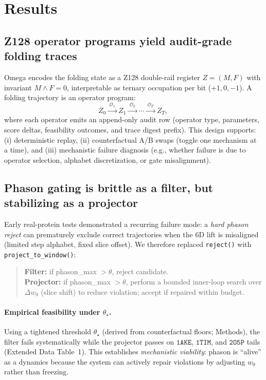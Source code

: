 \documentclass[10pt]{article}
\begin{document}
\section{Results}

\subsection{Z128 operator programs yield audit-grade folding traces}
Omega encodes the folding state as a Z128 double-rail register \(Z=(M,F)\) with invariant \(M \wedge F = 0\), interpretable as ternary occupation per bit (\(+1,0,-1\)).
A folding trajectory is an operator program:
\[
Z_0 \xrightarrow{\;\mathcal{O}_1\;} Z_1 \xrightarrow{\;\mathcal{O}_2\;} \cdots \xrightarrow{\;\mathcal{O}_T\;} Z_T,
\]
where each operator emits an append-only audit row (operator type, parameters, score deltas, feasibility outcomes, and trace digest prefix).
This design supports:
(i) deterministic replay,
(ii) counterfactual A/B swaps (toggle one mechanism at a time),
and (iii) mechanistic failure diagnosis (e.g., whether failure is due to operator selection, alphabet discretization, or gate misalignment).

\subsection{Phason gating is brittle as a filter, but stabilizing as a projector}
Early real-protein tests demonstrated a recurring failure mode: a \emph{hard phason reject} can prematurely exclude correct trajectories when the 6D lift is misaligned (limited step alphabet, fixed slice offset).
We therefore replaced \texttt{reject()} with \texttt{project\_to\_window()}:

\begin{quote}
\textbf{Filter:} if phason\_max \(>\theta\), reject candidate. \\
\textbf{Projector:} if phason\_max \(>\theta\), perform a bounded inner-loop search over \(\Delta w_0\) (slice shift) to reduce violation; accept if repaired within budget.
\end{quote}

\paragraph{Empirical feasibility under \(\theta_\star\).}
Using a tightened threshold \(\theta_\star\) (derived from counterfactual floors; Methods), the filter fails systematically while the projector passes on \(\texttt{1AKE}\), \(\texttt{1TIM}\), and \(\texttt{2O5P}\) tails (Extended Data Table~1).
This establishes \emph{mechanistic viability}: phason is ``alive'' as a dynamics because the system can actively repair violations by adjusting \(w_0\) rather than freezing.
\end{document}

